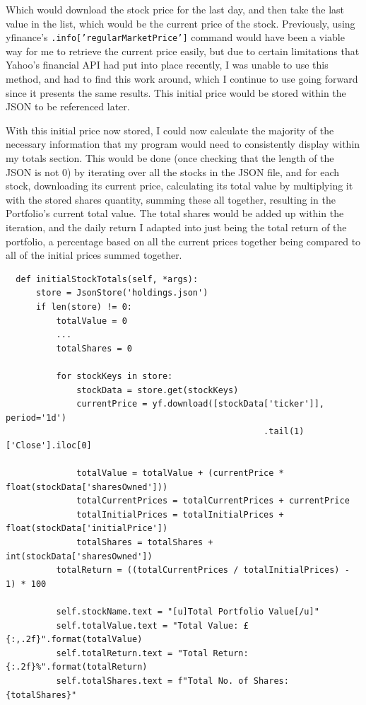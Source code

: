 \documentclass{article}
\begin{document}
\vspace{0.3cm}
Which would download the stock price for the last day, and then take the last value in the list, which would be the current price of the stock. Previously, using yfinance's \texttt{.info['regularMarketPrice']} command would have been a viable way for me to retrieve the current price easily, but due to certain limitations that Yahoo's financial API had put into place recently, I was unable to use this method, and had to find this work around, which I continue to use going forward since it presents the same results. This initial price would be stored within the JSON to be referenced later.\\\vspace{0.3cm}

With this initial price now stored, I could now calculate the majority of the necessary information that my program would need to consistently display within my totals section. This would be done (once checking that the length of the JSON is not 0) by iterating over all the stocks in the JSON file, and for each stock, downloading its current price, calculating its total value by multiplying it with the stored shares quantity, summing these all together, resulting in the Portfolio's current total value. The total shares would be added up within the iteration, and the daily return I adapted into just being the total return of the portfolio, a percentage based on all the current prices together being compared to all of the initial prices summed together.\\\vspace{0.3cm}

\begin{verbatim}
  def initialStockTotals(self, *args):
      store = JsonStore('holdings.json')
      if len(store) != 0:
          totalValue = 0
          ...
          totalShares = 0

          for stockKeys in store:
              stockData = store.get(stockKeys)
              currentPrice = yf.download([stockData['ticker']], period='1d')
                                                   .tail(1)['Close'].iloc[0]

              totalValue = totalValue + (currentPrice * float(stockData['sharesOwned']))
              totalCurrentPrices = totalCurrentPrices + currentPrice
              totalInitialPrices = totalInitialPrices + float(stockData['initialPrice'])
              totalShares = totalShares + int(stockData['sharesOwned'])
          totalReturn = ((totalCurrentPrices / totalInitialPrices) - 1) * 100

          self.stockName.text = "[u]Total Portfolio Value[/u]"
          self.totalValue.text = "Total Value: £{:,.2f}".format(totalValue)
          self.totalReturn.text = "Total Return: {:.2f}%".format(totalReturn)
          self.totalShares.text = f"Total No. of Shares: {totalShares}"
\end{verbatim}
\end{document}
